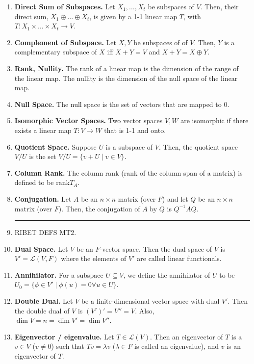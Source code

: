 \begin{enumerate}
      \item \textbf{Direct Sum of Subspaces. } Let $X_1,\dots,X_t$ be subspaces of $V$. Then, their direct sum, $X_1 \oplus \dots \oplus X_t$, is given by a 1-1 linear map $T$, with $T: X_1\times \dots \times X_t \to V$.
	\item \textbf{Complement of Subspace. } Let $X,Y$ be subspaces of of $V$. Then, $Y$ is a complementary subspace of $X$ iff $X+Y=V$ and $X+Y = X \oplus Y$. 
	\item \textbf{Rank, Nullity. } The rank of a linear map is the dimension of the range of the linear map. The nullity is the dimension of the null space of the linear map. 
	\item \textbf{Null Space. } The null space is the set of vectors that are mapped to $0$. 
	\item \textbf{Isomorphic Vector Spaces. } Two vector spaces $V, W$ are isomorphic if there exists a linear map $T: V \to W$ that is 1-1 and onto. 
	\item \textbf{Quotient Space. } Suppose $U$ is a subspace of $V$. Then, the quotient space $V / U$ is the set $V / U = \{v + U \mid v \in V\}$. 
	\item \textbf{Column Rank. } The column rank (rank of the column span of a matrix) is defined to be $\textrm{rank}T_A$. 
	\item \textbf{Conjugation. } Let $A$ be an $n \times n$ matrix (over $F$) and let $Q$ be an $n \times n$ matrix (over $F$). Then, the conjugation of $A$ by $Q$ is $Q^{-1}AQ$.
	\begin{center}
		\hrule
	\end{center}
	\item RIBET DEFS MT2.
	\item \textbf{Dual Space. } Let $V$ be an $F$-vector space. Then the dual space of $V$ is $V' = \mathscr{L}(V,F)$ where the elements of $V'$ are called linear functionals. 
	\item \textbf{Annihilator. } For a subspace $U \subseteq V$, we define the annihilator of $U$ to be $U_0 = \{\phi \in V' \mid \phi(u) = 0 \forall u \in U\}$. 
	\item \textbf{Double Dual. } Let $V$ be a finite-dimensional vector space with dual $V'$. Then the double dual of $V$ is $(V')' = V'' = V$. Also, $\dim V = n = \dim V' = \dim V''$. 
	\item \textbf{Eigenvector / eigenvalue. } Let $T \in \mathscr{L}(V)$. Then an eigenvector of $T$ is a $v \in V$ ($v \neq 0$) such that $Tv = \lambda v$ ($\lambda \in F$ is called an eigenvalue), and $v$ is an eigenvector of $T$. 

\end{enumerate}
